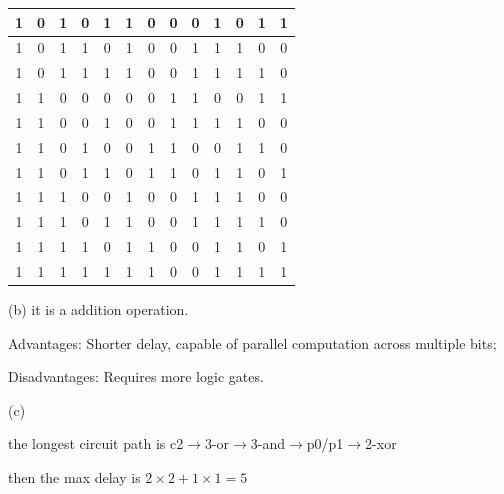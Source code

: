 \documentclass[a4paper]{article}
\begin{document}
\begin{answer}[Question 1]
\begin{center}
\begin{tabular}{ |c|c|c|c|c|c|c|c|c|c|c|c|c| }
            \hline
            1&0&1&0&1&1&0&0&0&1&0&1&1\\
            \hline
            1&0&1&1&0&1&0&0&1&1&1&0&0\\
            \hline
            1&0&1&1&1&1&0&0&1&1&1&1&0\\
            \hline
            1&1&0&0&0&0&0&1&1&0&0&1&1\\
            \hline
            1&1&0&0&1&0&0&1&1&1&1&0&0\\
            \hline
            1&1&0&1&0&0&1&1&0&0&1&1&0\\
            \hline
            1&1&0&1&1&0&1&1&0&1&1&0&1\\
            \hline
            1&1&1&0&0&1&0&0&1&1&1&0&0\\
            \hline
            1&1&1&0&1&1&0&0&1&1&1&1&0\\
            \hline
            1&1&1&1&0&1&1&0&0&1&1&0&1\\
            \hline
            1&1&1&1&1&1&1&0&0&1&1&1&1\\
            \hline
        \end{tabular}        
    \end{center}
    (b)
    it is a addition operation.


    Advantages: Shorter delay, capable of parallel computation across multiple bits;

    Disadvantages: Requires more logic gates.

    (c)

    the longest circuit path is c2$\rightarrow$3-or$\rightarrow$3-and$\rightarrow$p0/p1$\rightarrow$2-xor

    then the max delay is $2\times2+1\times1=5$
\end{answer}

\newpage
\end{document}
